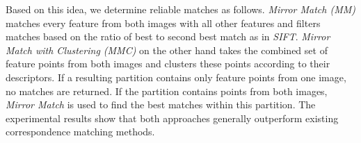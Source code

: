 Based on this idea,  we determine reliable matches as follows. 
\emph{Mirror Match (MM)} matches every feature from both images with all 
other features and filters matches based on the ratio of best to second 
best match as in \emph{SIFT}. \emph{Mirror Match with Clustering (MMC)} 
on the other hand takes the combined set of feature points from both 
images and clusters these points according to their descriptors.  If a 
resulting partition contains only feature points from one image, no 
matches are returned.  If the partition contains points from both 
images, \emph{Mirror Match} is used to find the best matches within this 
partition.  The experimental results show that both approaches generally 
outperform existing correspondence matching methods.
